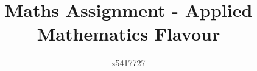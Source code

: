 \documentclass{article}
\title{Maths Assignment - Applied Mathematics Flavour}
\author{z5417727}
\begin{document}
\maketitle
{\LARGE \tableofcontents}
\newpage
\end{document}
